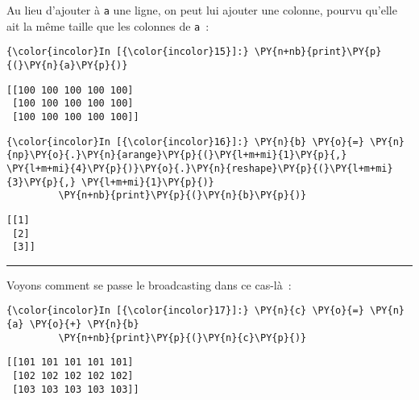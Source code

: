     Au lieu d'ajouter à \texttt{a} une ligne, on peut lui ajouter une
colonne, pourvu qu'elle ait la même taille que les colonnes de
\texttt{a}~:

    \begin{Verbatim}[commandchars=\\\{\},frame=single,framerule=0.3mm,rulecolor=\color{cellframecolor}]
{\color{incolor}In [{\color{incolor}15}]:} \PY{n+nb}{print}\PY{p}{(}\PY{n}{a}\PY{p}{)}
\end{Verbatim}


    \begin{Verbatim}[commandchars=\\\{\},frame=single,framerule=0.3mm,rulecolor=\color{cellframecolor}]
[[100 100 100 100 100]
 [100 100 100 100 100]
 [100 100 100 100 100]]
\end{Verbatim}

    \begin{Verbatim}[commandchars=\\\{\},frame=single,framerule=0.3mm,rulecolor=\color{cellframecolor}]
{\color{incolor}In [{\color{incolor}16}]:} \PY{n}{b} \PY{o}{=} \PY{n}{np}\PY{o}{.}\PY{n}{arange}\PY{p}{(}\PY{l+m+mi}{1}\PY{p}{,} \PY{l+m+mi}{4}\PY{p}{)}\PY{o}{.}\PY{n}{reshape}\PY{p}{(}\PY{l+m+mi}{3}\PY{p}{,} \PY{l+m+mi}{1}\PY{p}{)}
         \PY{n+nb}{print}\PY{p}{(}\PY{n}{b}\PY{p}{)}
\end{Verbatim}


    \begin{Verbatim}[commandchars=\\\{\},frame=single,framerule=0.3mm,rulecolor=\color{cellframecolor}]
[[1]
 [2]
 [3]]
\end{Verbatim}

    \begin{center}\rule{0.5\linewidth}{\linethickness}\end{center}

    Voyons comment se passe le broadcasting dans ce cas-là~:

    \begin{Verbatim}[commandchars=\\\{\},frame=single,framerule=0.3mm,rulecolor=\color{cellframecolor}]
{\color{incolor}In [{\color{incolor}17}]:} \PY{n}{c} \PY{o}{=} \PY{n}{a} \PY{o}{+} \PY{n}{b}
         \PY{n+nb}{print}\PY{p}{(}\PY{n}{c}\PY{p}{)}
\end{Verbatim}


    \begin{Verbatim}[commandchars=\\\{\},frame=single,framerule=0.3mm,rulecolor=\color{cellframecolor}]
[[101 101 101 101 101]
 [102 102 102 102 102]
 [103 103 103 103 103]]
\end{Verbatim}

